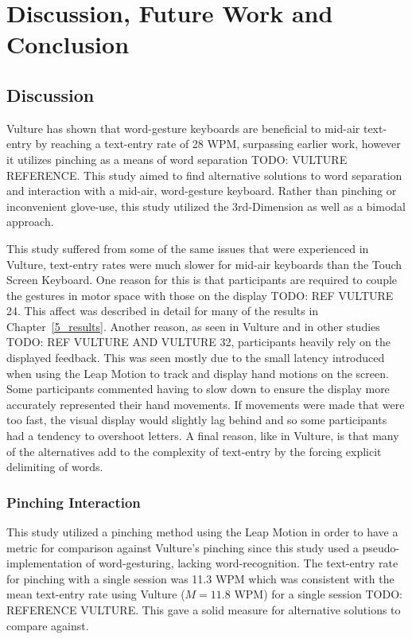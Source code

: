 \chapter{Discussion, Future Work and Conclusion}
\section{Discussion}
Vulture has shown that word-gesture keyboards are beneficial to mid-air text-entry by reaching a text-entry rate of 28 WPM, surpassing earlier work, however it utilizes pinching as a means of word separation TODO: VULTURE REFERENCE. This study aimed to find alternative solutions to word separation and interaction with a mid-air, word-gesture keyboard. Rather than pinching or inconvenient glove-use, this study utilized the 3rd-Dimension as well as a bimodal approach.

This study suffered from some of the same issues that were experienced in Vulture, text-entry rates were much slower for mid-air keyboards than the Touch Screen Keyboard. One reason for this is that participants are required to couple the gestures in motor space with those on the display TODO: REF VULTURE 24. This affect was described in detail for many of the results in Chapter~\ref{5_results}. Another reason, as seen in Vulture and in other studies TODO: REF VULTURE AND VULTURE 32, participants heavily rely on the displayed feedback. This was seen mostly due to the small latency introduced when using the Leap Motion to track and display hand motions on the screen. Some participants commented having to slow down to ensure the display more accurately represented their hand movements. If movements were made that were too fast, the visual display would slightly lag behind and so some participants had a tendency to overshoot letters. A final reason, like in Vulture, is that many of the alternatives add to the complexity of text-entry by the forcing explicit delimiting of words. 

\subsection{Pinching Interaction}
This study utilized a pinching method using the Leap Motion in order to have a metric for comparison against Vulture's pinching since this study used a pseudo-implementation of word-gesturing, lacking word-recognition. The text-entry rate for pinching with a single session was 11.3 WPM which was consistent with the mean text-entry rate using Vulture ($M = 11.8$ WPM) for a single session TODO: REFERENCE VULTURE. This gave a solid measure for alternative solutions to compare against.

